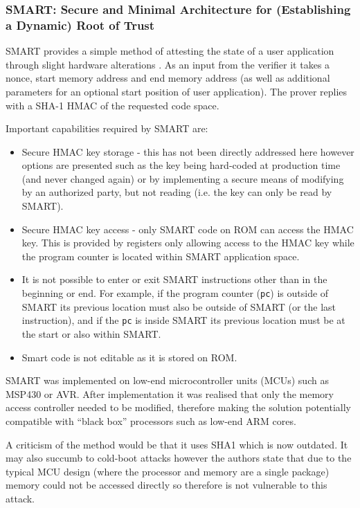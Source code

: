 \subsubsection*{SMART: Secure and Minimal Architecture for (Establishing a Dynamic) Root of Trust}
SMART provides a simple method of attesting the state of a user application through slight hardware alterations \cite{For}. As an input from the verifier it takes a nonce, start memory address and end memory address (as well as additional parameters for an optional start position of user application). The prover replies with a SHA-1 HMAC of the requested code space.

Important capabilities required by SMART are:
\begin{itemize}
	\item Secure HMAC key storage - this has not been directly addressed here however options are presented such as the key being hard-coded at production time (and never changed again) or by implementing a secure means of modifying by an authorized party, but not reading (i.e. the key can only be read by SMART).
	\item Secure HMAC key access - only SMART code on ROM can access the HMAC key. This is provided by registers only allowing access to the HMAC key while the program counter is located within SMART application space.
	\item It is not possible to enter or exit SMART instructions other than in the beginning or end. For example, if the program counter (\verb|pc|) is outside of SMART its previous location must also be outside of SMART (or the last instruction), and if the \verb|pc| is inside SMART its previous location must be at the start or also within SMART.
	\item Smart code is not editable as it is stored on ROM.
\end{itemize}

SMART was implemented on low-end microcontroller units (MCUs) such as MSP430 or AVR. After implementation it was realised that only the memory access controller needed to be modified, therefore making the solution potentially compatible with ``black box'' processors such as low-end ARM cores.

A criticism of the method would be that it uses SHA1 which is now outdated. It may also succumb to cold-boot attacks however the authors state that due to the typical MCU design (where the processor and memory are a single package) memory could not be accessed directly so therefore is not vulnerable to this attack.


